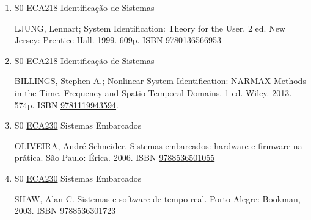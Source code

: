 \documentclass[12pt,a4paper]{book}
\begin{document}
\begin{enumerate}
 
 \item S0 \hyperref[PUD:ECA218]{ECA218} Identificação de Sistemas

 LJUNG, Lennart;  System Identification: Theory for the User.  2 ed.  New
Jersey: Prentice Hall.  1999.  609p.  ISBN \href{http://www.isbnsearch.org/isbn/9780136566953}{9780136566953}
 
 
 \item S0 \hyperref[PUD:ECA218]{ECA218} Identificação de Sistemas

 BILLINGS, Stephen A.;  Nonlinear System Identification: NARMAX Methods in the Time, Frequency and Spatio-Temporal Domains.  1 ed.  Wiley.  2013.  574p.  ISBN \href{http://www.google.com/search?hl=pt-BR&tbo=p&tbm=bks&q=isbn:9781119943594&num=10}{9781119943594}.
 \item S0 \hyperref[PUD:ECA230]{ECA230} Sistemas Embarcados

 OLIVEIRA, André Schneider.  Sistemas embarcados: hardware e firmware na prática.  São Paulo: Érica.  2006.  ISBN \href{http://www.bn.br/site/pages/servicosProfissionais/agenciaISBN/isbnBusca/FbnBuscaISBNCatalogo.asp?pField=ISBN&pIntPagina=1&pISBN=36501055&nidbISBN=true&hidbISBN=true}{9788536501055}
 
 
 \item S0 \hyperref[PUD:ECA230]{ECA230} Sistemas Embarcados

 SHAW, Alan C.  Sistemas e software de tempo real.  Porto Alegre: Bookman, 2003.  ISBN \href{http://www.bn.br/site/pages/servicosProfissionais/agenciaISBN/isbnBusca/FbnBuscaISBNCatalogo.asp?pField=ISBN&pIntPagina=1&pISBN=36301723&nidbISBN=true&hidbISBN=true}{9788536301723}
 
 \end{enumerate}
\newpage
\end{document}
